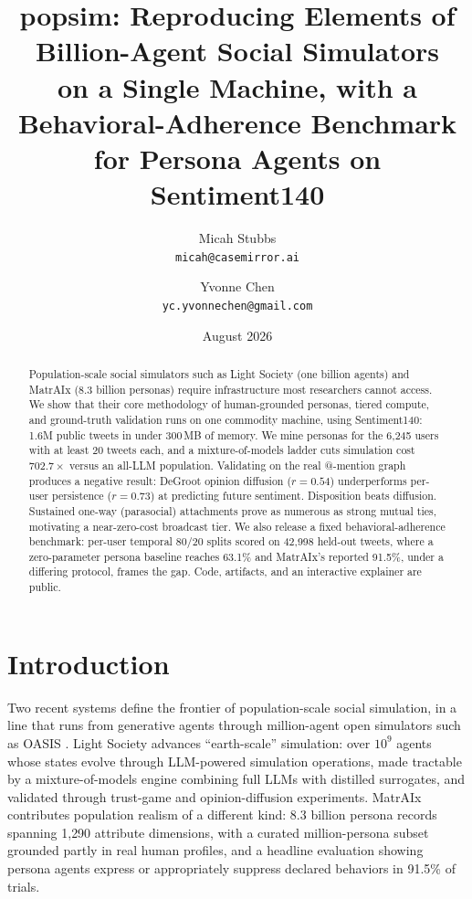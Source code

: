\documentclass[twocolumn,10pt]{article}
\title{\textbf{popsim}: Reproducing Elements of Billion-Agent Social Simulators\\
on a Single Machine, with a Behavioral-Adherence Benchmark\\
for Persona Agents on Sentiment140}
\author{
  Micah Stubbs\\
  \texttt{micah@casemirror.ai}
  \and
  Yvonne Chen\\
  \texttt{yc.yvonnechen@gmail.com}
}
\date{August 2026}
\makeatletter
\newcommand{\paperurlof}[1]{\csname paperurl@#1\endcsname}
\newcommand{\ecite}[1]{\href{\paperurlof{#1}}{\NoHyper\cite{#1}\endNoHyper}}
\makeatother
\begin{document}
\maketitle

\begin{abstract}
Population-scale social simulators such as Light Society (one billion agents)
and MatrAIx (8.3 billion personas) require infrastructure most researchers
cannot access. We show that their core methodology of human-grounded personas,
tiered compute, and ground-truth validation runs on one commodity machine,
using Sentiment140: 1.6M public tweets in under 300\,MB of memory. We mine
personas for the 6{,}245 users with at least 20 tweets each, and a
mixture-of-models ladder cuts simulation cost $702.7\times$ versus an all-LLM
population. Validating on the real @-mention graph produces a negative result:
DeGroot opinion diffusion ($r=0.54$) underperforms per-user persistence
($r=0.73$) at predicting future sentiment. Disposition beats diffusion.
Sustained one-way (parasocial) attachments prove as numerous as strong mutual
ties, motivating a near-zero-cost broadcast tier. We also release a fixed
behavioral-adherence benchmark: per-user temporal 80/20 splits scored on
42{,}998 held-out tweets, where a zero-parameter persona baseline reaches
63.1\% and MatrAIx's reported 91.5\%, under a differing protocol, frames the
gap. Code, artifacts, and an interactive explainer are public.
\end{abstract}

\section{Introduction}

Two recent systems define the frontier of population-scale social simulation,
in a line that runs from generative agents \ecite{park2023} through
million-agent open simulators such as OASIS \ecite{oasis}.
Light Society \ecite{lightsociety} advances
``earth-scale'' simulation: over
$10^9$ agents whose states evolve through LLM-powered simulation operations,
made tractable by a mixture-of-models engine combining full LLMs with distilled
surrogates, and validated through trust-game and opinion-diffusion experiments.
MatrAIx \ecite{matraix} contributes
population realism of a different kind: 8.3
billion persona records spanning 1{,}290 attribute dimensions, with a curated
million-persona subset grounded partly in real human profiles, and a headline
evaluation showing persona agents express or appropriately suppress declared
behaviors in 91.5\% of trials.
\end{document}
